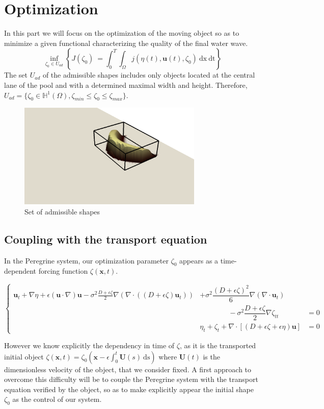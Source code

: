 \documentclass[11pt,a4paper]{article}
\begin{document}
\section{Optimization}
	In this part we will focus on the optimization of the moving object so as to minimize a given functional characterizing the quality of the final water wave.
	\begin{equation}
		\inf_{\zeta_0 \in U_{ad}}\left\{J(\zeta_0)\ = \int_0^T {\int_{\Omega}{\! j(\eta(t), \mathbf{u}(t), \zeta_0) \: \mathrm{dx}} \: \mathrm{dt}} \right\}
	\end{equation}
	The set $U_{ad}$ of the admissible shapes includes only objects located at the central lane of the pool and with a determined maximal width and height. Therefore, $U_{ad} = \{\zeta_0 \in \mathbb{H}^1(\Omega), \zeta_{min} \leq \zeta_0 \leq \zeta_{max}   \}$.
	\begin{figure}[!h]
		\centering
		\includegraphics[height=5cm]{ObjectBoundaries.png}
		\caption{Set of admissible shapes}
	\end{figure}

\subsection{Coupling with the transport equation}
	In the Peregrine system, our optimization parameter $\zeta_0$ appears as a time-dependent forcing function $\zeta(\mathbf{x}, t)$.
	\begin{center}
		$\left\lbrace
			\begin{array}{rll}
				\displaystyle \mathbf{u}_t + \nabla \eta + \epsilon (\mathbf{u} \cdot \nabla)\mathbf{u} - \sigma^2\frac{D + \epsilon \zeta}{2}\nabla (\nabla \cdot ((D + \epsilon \zeta) \mathbf{u}_t)) & + \sigma^2 \dfrac{(D + \epsilon \zeta)^2}{6}\nabla (\nabla \cdot \mathbf{u}_t)  &  \\
				& \qquad \qquad -  \sigma^2\dfrac{D + \epsilon \zeta}{2}\nabla \zeta_{tt}  & =  0 \\
				& \displaystyle \eta_t+\zeta_t + \nabla \cdot [(D + \epsilon \zeta+\epsilon\eta)\mathbf{u}] & =  0
			\end{array}
		\right.$
	\end{center}
	However we know explicitly the dependency in time of $\zeta$, as it is the transported initial object $\zeta(\mathbf{x},t) =  \zeta_0(\mathbf{x} - \epsilon \int_0^t{\! \mathbf{U}(s) \: \mathrm{ds}})$ where $\mathbf{U}(t)$ is the dimensionless velocity of the object, that we consider fixed. A first approach to overcome this difficulty will be to couple the Peregrine system with the transport equation verified by the object, so as to make explicitly appear the initial shape $\zeta_0$ as the control of our system.
	
\end{document}
